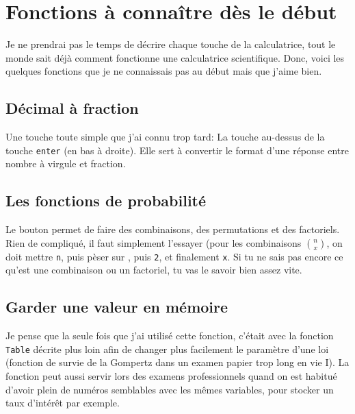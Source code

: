 \section{Fonctions à connaître dès le début}
\label{sec:fonctiondebut}

Je ne prendrai pas le temps de décrire chaque touche de la calculatrice, tout le monde sait déjà comment fonctionne une calculatrice scientifique. Donc, voici les quelques fonctions que je ne connaissais pas au début mais que j'aime bien.

\subsection{Décimal à fraction}
Une touche toute simple que j'ai connu trop tard: La touche  %
au-dessus de la touche \texttt{enter} (en bas à droite). Elle sert à convertir le format d'une réponse entre nombre à virgule et fraction.

\subsection{Les fonctions de probabilité}
Le bouton  permet de faire des combinaisons, des permutations et des factoriels. Rien de compliqué, il faut simplement l'essayer (pour les combinaisons ${n \choose x}$, on doit mettre \texttt{n}, puis pèser sur , puis \texttt{2}, et finalement \texttt{x}. Si tu ne sais pas encore ce qu'est une combinaison ou un factoriel, tu vas le savoir bien assez vite.

\subsection{Garder une valeur en mémoire}
Je pense que la seule fois que j'ai utilisé cette fonction, c'était avec la fonction \texttt{Table} décrite plus loin afin de changer plus facilement le paramètre d'une loi (fonction de survie de la Gompertz dans un examen papier trop long en vie I). La fonction peut aussi servir lors des examens professionnels quand on est habitué d'avoir plein de numéros semblables avec les mêmes variables, pour stocker un taux d'intérêt par exemple.

